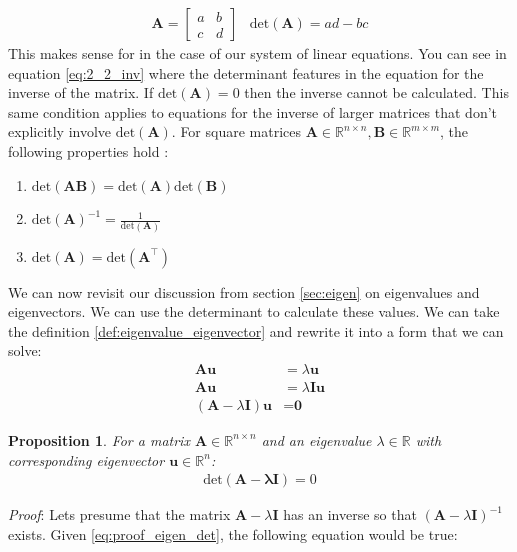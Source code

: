 \documentclass[a4paper,12pt]{article}
\newcommand{\matrx}[1]{\bm{#1}}
\newcommand{\vectr}[1]{\textbf{#1}}
\newcommand{\real}{\mathbb{R}}
\newcommand{\italic}[1]{\textit{#1}}
\newcommand{\dett}[1]{\text{det}(\matrx{#1})}
\newtheorem{proposition}{Proposition}[section]
\begin{document}
	\begin{align}
		\matrx{A} = \begin{bmatrix}
			a & b \\
			c & d
		\end{bmatrix}
		\hspace{10pt}
		\dett{A} = ad - bc
	\end{align}
	This makes sense for in the case of our system of linear equations. You can see in equation \ref{eq:2_2_inv} where the determinant features in the equation for the inverse of the matrix. If $ \dett{A} = 0$ then the inverse cannot be calculated. This same condition applies to equations for the inverse of larger matrices that don't explicitly involve $ \dett{A} $. For square matrices $ \matrx{A} \in \real^{n \times n}, \matrx{B} \in \real^{m \times m} $, the following properties hold \cite[page 103]{mml_book}:
	\begin{enumerate}
		\item $ \dett{AB} = \dett{A}\dett{B} $
		\item $ \dett{A}^{-1} = \frac{1}{\dett{A}} $
		\item $ \dett{A} = \dett{A^{\top}}$
	\end{enumerate}
	We can now revisit our discussion from section \ref{sec:eigen} on eigenvalues and eigenvectors. We can use the determinant to calculate these values. We can take the definition \ref{def:eigenvalue_eigenvector} and rewrite it into a form that we can solve:
	\begin{align}
		\matrx{A} \vectr{u} &= \lambda \vectr{u} \\
		\matrx{A} \vectr{u} &= \lambda \matrx{I} \vectr{u} \\
		(\matrx{A} - \lambda \matrx{I}) \vectr{u} &= \vectr{0} 
		\label{eq:proof_eigen_det}
	\end{align}
	\begin{proposition}
		\normalfont For a matrix $ \matrx{A} \in \real^{n \times n} $ and an eigenvalue $ \lambda \in \real $ with corresponding eigenvector $ \vectr{u} \in \real^{n} $: 
		\begin{align}
			\dett{\matrx{A} - \lambda \matrx{I}} = 0
		\end{align}
		\label{prop:det_eigen_eq}
	\end{proposition} 
	\italic{Proof}: Lets presume that the matrix $ \matrx{A} - \lambda \matrx{I} $ has an inverse so that $ (\matrx{A} - \lambda \matrx{I})^{-1} $ exists. Given \ref{eq:proof_eigen_det}, the following equation would be true: 
\end{document}
